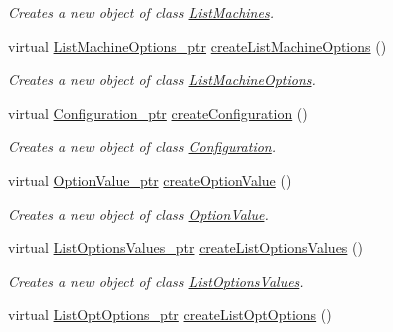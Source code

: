 \begin{DoxyCompactItemize}
\begin{DoxyCompactList}\small\item\em Creates a new object of class \hyperlink{classUMS__Data_1_1ListMachines}{ListMachines}. \item\end{DoxyCompactList}\item 
virtual \hyperlink{classUMS__Data_1_1ListMachineOptions}{ListMachineOptions\_\-ptr} \hyperlink{classUMS__Data_1_1UMS__DataFactory_ada04098b38e43de152bcbc5a281c3436}{createListMachineOptions} ()
\begin{DoxyCompactList}\small\item\em Creates a new object of class \hyperlink{classUMS__Data_1_1ListMachineOptions}{ListMachineOptions}. \item\end{DoxyCompactList}\item 
virtual \hyperlink{classUMS__Data_1_1Configuration}{Configuration\_\-ptr} \hyperlink{classUMS__Data_1_1UMS__DataFactory_a66a6fe374361a09a8b923477b47c6246}{createConfiguration} ()
\begin{DoxyCompactList}\small\item\em Creates a new object of class \hyperlink{classUMS__Data_1_1Configuration}{Configuration}. \item\end{DoxyCompactList}\item 
virtual \hyperlink{classUMS__Data_1_1OptionValue}{OptionValue\_\-ptr} \hyperlink{classUMS__Data_1_1UMS__DataFactory_ace1b75928e6764682552e88407c38848}{createOptionValue} ()
\begin{DoxyCompactList}\small\item\em Creates a new object of class \hyperlink{classUMS__Data_1_1OptionValue}{OptionValue}. \item\end{DoxyCompactList}\item 
virtual \hyperlink{classUMS__Data_1_1ListOptionsValues}{ListOptionsValues\_\-ptr} \hyperlink{classUMS__Data_1_1UMS__DataFactory_a6968cafc5e52e9030e36b5d9a57af21b}{createListOptionsValues} ()
\begin{DoxyCompactList}\small\item\em Creates a new object of class \hyperlink{classUMS__Data_1_1ListOptionsValues}{ListOptionsValues}. \item\end{DoxyCompactList}\item 
virtual \hyperlink{classUMS__Data_1_1ListOptOptions}{ListOptOptions\_\-ptr} \hyperlink{classUMS__Data_1_1UMS__DataFactory_addbde1c2fbb6f2c855d50b0004ba8dfd}{createListOptOptions} ()

\end{DoxyCompactItemize}
